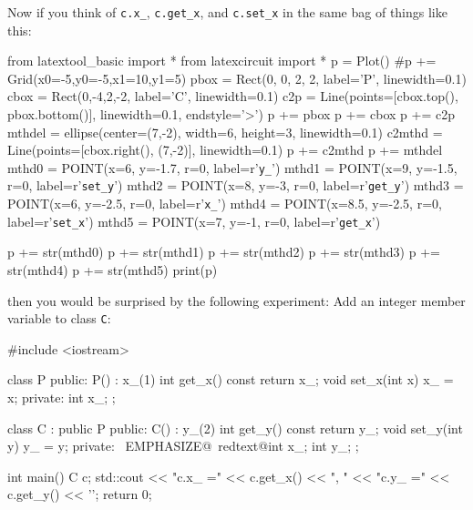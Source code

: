Now if you think of \verb!c.x_!, \verb!c.get_x!, and \verb!c.set_x!
in the same bag of things like this:
\begin{python}
from latextool_basic import *
from latexcircuit import *
p = Plot()
#p += Grid(x0=-5,y0=-5,x1=10,y1=5)
pbox = Rect(0, 0, 2, 2, label='P', linewidth=0.1)
cbox = Rect(0,-4,2,-2, label='C', linewidth=0.1)
c2p = Line(points=[cbox.top(), pbox.bottom()], linewidth=0.1, endstyle='>')
p += pbox
p += cbox
p += c2p
mthdel = ellipse(center=(7,-2), width=6, height=3, linewidth=0.1)
c2mthd = Line(points=[cbox.right(), (7,-2)], linewidth=0.1)
p += c2mthd
p += mthdel
mthd0 = POINT(x=6, y=-1.7, r=0, label=r'\verb!y_!')
mthd1 = POINT(x=9, y=-1.5, r=0, label=r'\verb!set_y!')
mthd2 = POINT(x=8, y=-3, r=0, label=r'\verb!get_y!')
mthd3 = POINT(x=6, y=-2.5, r=0, label=r'\verb!x_!')
mthd4 = POINT(x=8.5, y=-2.5, r=0, label=r'\verb!set_x!')
mthd5 = POINT(x=7, y=-1, r=0, label=r'\verb!get_x!')

p += str(mthd0)
p += str(mthd1)
p += str(mthd2)
p += str(mthd3)
p += str(mthd4)
p += str(mthd5)
print(p)
\end{python}
then you would be surprised by the following experiment: Add an integer
member variable to class \verb!C!:

\begin{console}[commandchars=\~\@\$]
#include <iostream>

class P
{
public:
        P() : x_(1) {}
        int get_x() const { return x_; }
        void set_x(int x) { x_ = x; }
private:
        int x_;
};

class C : public P
{
public:
        C() : y_(2) {}
        int get_y() const { return y_; }
        void set_y(int y) { y_ = y; }
private:
        ~EMPHASIZE@~redtext@int x_;$$
        int y_;
};

int main()
{   
    C c;
    std::cout << "c.x_ =" << c.get_x() << ", "
              << "c.y_ =" << c.get_y() << '\n';
    return 0;
}
\end{console}

